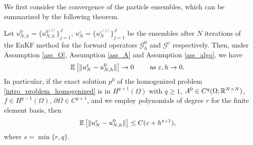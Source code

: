 We first consider the convergence of the particle ensembles, which can be summarized by the following theorem.
\begin{theorem} \label{convergence_result_full}
Let $u_{N,h}^0 = \{ u_{N,h}^{0^{(j)}} \}_{j=1}^J$, $u_N^{\varepsilon} = \{ u_N^{\varepsilon^{(j)}} \}_{j=1}^J$ be the ensembles after $N$ iterations of the EnKF method for the forward operators $\mathcal{G}^0_h$ and $\mathcal{G}^{\varepsilon}$ respectively.
Then, under Assumption \ref{ass_O}, Assumption \ref{ass_A} and Assumption \ref{ass_algo}, we have
\begin{equation*}
\mathbb{E} \left [ \lVert u_N^{\varepsilon} - u_{N,h}^0\rVert \right ] \to 0 \qquad \text{ as } \varepsilon, h \to 0.
\end{equation*}
In particular, if the exact solution $p^0$ of the homogenized problem \eqref{intro_problem_homogenized} is in $H^{q+1}(\Omega)$ with $q \ge 1$, $A^0 \in C^q(\Omega;\mathbb{R}^{N \times N})$, $f \in H^{q-1}(\Omega)$, $\partial \Omega \in C^{q+1}$, and we employ polynomials of degree $r$ for the finite element basis, then
\begin{equation*}
\mathbb{E} \left [ \lVert u_N^{\varepsilon} - u_{N,h}^0\rVert \right ] \le C ( \varepsilon + h^{s+1} ),
\end{equation*}
where $s = \min \{ r, q \}$.
\end{theorem}

